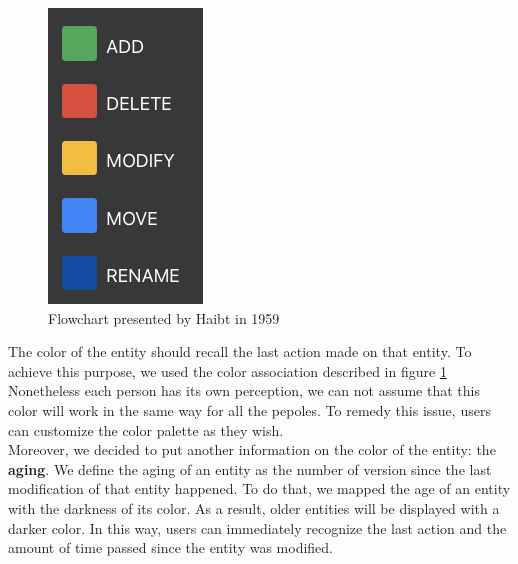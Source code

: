 \begin{figure}
    \begin{center}
        \includegraphics[width=0.7\linewidth]{ColorAssociation.png} 
        \caption{Flowchart presented by Haibt in 1959}
        \label{fig:ColorAssociation}
    \end{center}
\end{figure}

The color of the entity should recall the last action made on that entity. To achieve this purpose, we used the color association described in figure \ref{fig:ColorAssociation}
Nonetheless each person has its own perception, we can not assume that this color will work in the same way for all the pepoles.
To remedy this issue, users can customize the color palette as they wish. \\

Moreover, we decided to put another information on the color of the entity: the \textbf{aging}. 
We define the aging of an entity as the number of version since the last modification of that entity happened.
To do that, we mapped the age of an entity with the darkness of its color. 
As a result, older entities will be displayed with a darker color. 
In this way, users can immediately recognize the last action and the amount of time passed since the entity was modified.
